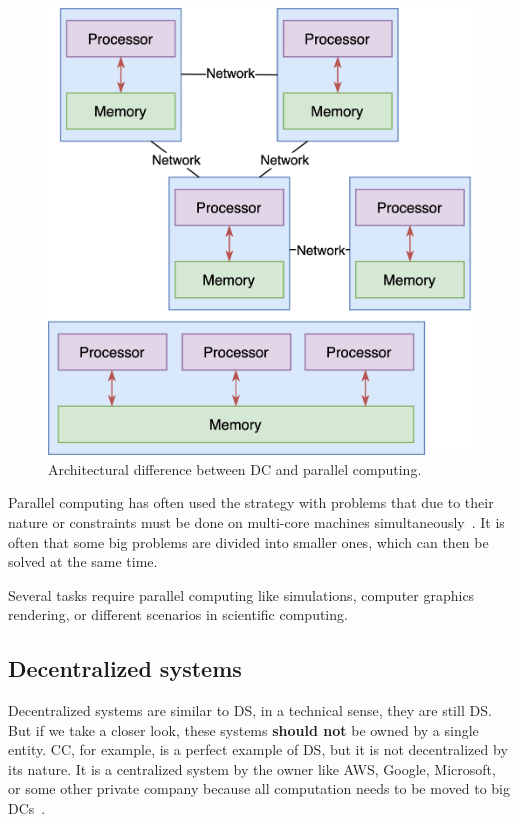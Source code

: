 \begin{figure}[H]
	\begin{center}
		\includegraphics[scale=0.6]{images/Figure4}
	\end{center}
	\vspace{-0.6cm}
	\caption{Architectural difference between DC and parallel computing.}
	\label{fig:fig4}
\end{figure}

\noindent
Parallel computing has often used the strategy with problems that due to their nature or constraints must be done on multi-core machines simultaneously~\cite{0072397}. It is often that some big problems are divided into smaller ones, which can then be solved at the same time. 

Several tasks require parallel computing like simulations, computer graphics rendering, or different scenarios in scientific computing.
%
%
\subsection{Decentralized systems}\label{sec:decentralized_systems}
%
Decentralized systems are similar to DS, in a technical sense, they are still DS. But if we take a closer look, these systems \textbf{should not} be owned by a single entity. CC, for example, is a perfect example of DS, but it is not decentralized by its nature. It is a centralized system by the owner like AWS, Google, Microsoft, or some other private company because all computation needs to be moved to big DCs~\cite{HossainRH18}.

